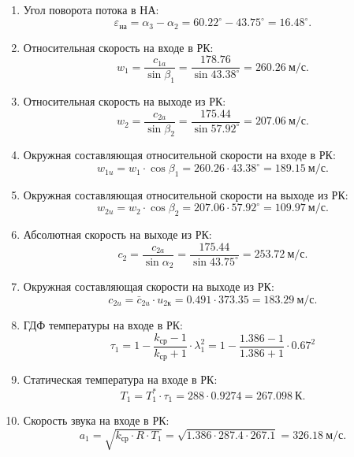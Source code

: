 \documentclass[a4paper,12pt]{article}
\begin{document}
\begin{enumerate}
         \item Угол поворота потока в НА:
        \[
            \varepsilon_{на} = \alpha_3 - \alpha_2 = 
            60.22^\circ - 43.75^\circ = 
            16.48^\circ.
        \]

        \item Относительная скорость на входе в РК:
        \[
            w_1 = \frac{ c_{1a} }{ \sin{\beta_1} } = 
            \frac{ 178.76 }{ \sin{ 43.38^\circ } } = 
            260.26\ м/с.
        \]

        \item Относительная скорость на выходе из РК:
        \[
            w_2 = \frac{ c_{2a} }{ \sin{\beta_2} } = 
            \frac{ 175.44 }{ \sin{ 57.92^\circ } } = 
            207.06\ м/с.
        \]

        \item Окружная составляющая относительной скорости на входе в РК:
        \[
            w_{1u} = w_1 \cdot \cos{ \beta_1 } = 
            260.26 \cdot 43.38^\circ = 
            189.15 \ м/с.
        \]

        \item Окружная составляющая относительной скорости на выходе из РК:
        \[
            w_{2u} = w_2 \cdot \cos{ \beta_2 } = 
            207.06 \cdot 57.92^\circ = 
            109.97 \ м/с.
        \]

        \item Абсолютная скорость на выходе из РК:
        \[
            c_2 = \frac{ c_{2a} }{ \sin{\alpha_2} } = 
            \frac{ 175.44 }{ \sin{ 43.75^\circ } } = 
            253.72\ м/с.
        \]

        \item Окружная составляющая скорости на выходе из РК:
        \[
            c_{2u} = \bar{c}_{2u} \cdot u_{2к} = 
            0.491 \cdot 373.35 = 
            183.29\ м/с.
        \]

        \item ГДФ температуры на входе в РК:
        \[
            \tau_1 = 1 - \frac{ k_{ср} - 1 }{ k_{ср} + 1 } \cdot \lambda_1^2 =  
            1 - \frac{ 1.386 - 1 }{ 1.386 + 1 } \cdot 0.67^2
        \]

        \item Статическая температура на входе в РК:
        \[
            T_1 = T_1^* \cdot \tau_1 = 288 \cdot 0.9274 = 
            267.098\ К.
        \]

        \item Скорость звука на входе в РК:
        \[
            a_1 = \sqrt{ k_{ср} \cdot R \cdot T_1 } = 
            \sqrt{ 1.386 \cdot 287.4 \cdot 267.1 } =
            326.18\ м/с.
        \]


\end{enumerate}
\end{document}
